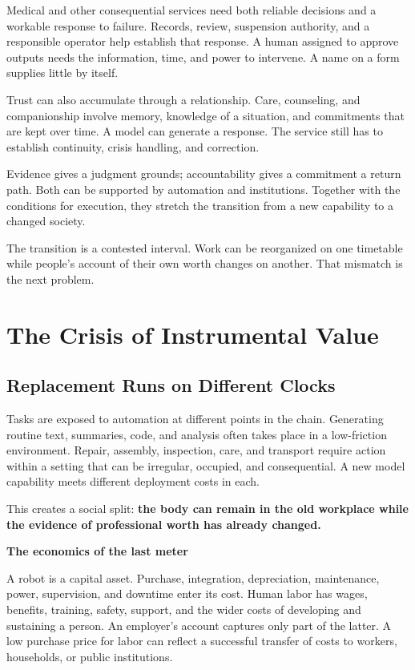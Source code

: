\documentclass[11pt,openany]{book}
\newcommand{\key}[1]{\textbf{#1}}
\newcommand{\subhead}[1]{\par\medskip\noindent\textbf{#1}\par\nobreak\smallskip}
\begin{document}
Medical and other consequential services need both reliable decisions and a workable response to failure. Records, review, suspension authority, and a responsible operator help establish that response. A human assigned to approve outputs needs the information, time, and power to intervene. A name on a form supplies little by itself.

Trust can also accumulate through a relationship. Care, counseling, and companionship involve memory, knowledge of a situation, and commitments that are kept over time. A model can generate a response. The service still has to establish continuity, crisis handling, and correction.

Evidence gives a judgment grounds; accountability gives a commitment a return path. Both can be supported by automation and institutions. Together with the conditions for execution, they stretch the transition from a new capability to a changed society.

The transition is a contested interval. Work can be reorganized on one timetable while people's account of their own worth changes on another. That mismatch is the next problem.

\section{The Crisis of Instrumental Value}

\subsection{Replacement Runs on Different Clocks}

Tasks are exposed to automation at different points in the chain. Generating routine text, summaries, code, and analysis often takes place in a low-friction environment. Repair, assembly, inspection, care, and transport require action within a setting that can be irregular, occupied, and consequential. A new model capability meets different deployment costs in each.

This creates a social split: \key{the body can remain in the old workplace while the evidence of professional worth has already changed.}

\subhead{The economics of the last meter}

A robot is a capital asset. Purchase, integration, depreciation, maintenance, power, supervision, and downtime enter its cost. Human labor has wages, benefits, training, safety, support, and the wider costs of developing and sustaining a person. An employer's account captures only part of the latter. A low purchase price for labor can reflect a successful transfer of costs to workers, households, or public institutions.
\end{document}
